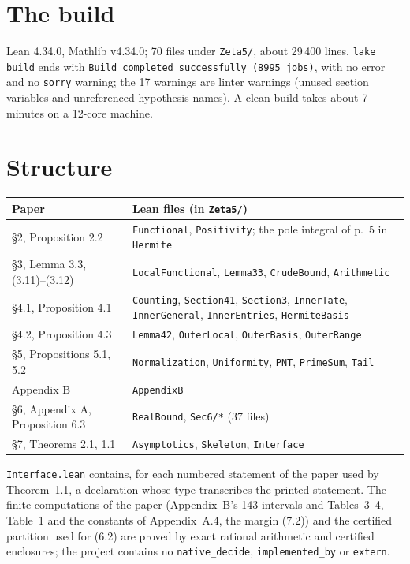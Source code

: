 \documentclass[11pt]{article}
\newcommand{\lean}[1]{\texttt{#1}}
\begin{document}
\section{The build}

Lean 4.34.0, Mathlib v4.34.0; 70 files under \lean{Zeta5/}, about 29\,400 lines.
\lean{lake build} ends with \lean{Build completed successfully (8995 jobs)}, with no error and
no \lean{sorry} warning; the 17 warnings are linter warnings (unused section variables and
unreferenced hypothesis names). A clean build takes about 7 minutes on a 12-core machine.

\section{Structure}

\begin{longtable}{p{}p{}}
\toprule
Paper & Lean files (in \lean{Zeta5/}) \\
\midrule
\endhead
\S2, Proposition 2.2 & \lean{Functional}, \lean{Positivity}; the pole integral of p.~5 in
\lean{Hermite} \\
\S3, Lemma 3.3, (3.11)--(3.12) & \lean{LocalFunctional}, \lean{Lemma33}, \lean{CrudeBound},
\lean{Arithmetic} \\
\S4.1, Proposition 4.1 & \lean{Counting}, \lean{Section41}, \lean{Section3}, \lean{InnerTate},
\lean{InnerGeneral}, \lean{InnerEntries}, \lean{HermiteBasis} \\
\S4.2, Proposition 4.3 & \lean{Lemma42}, \lean{OuterLocal}, \lean{OuterBasis},
\lean{OuterRange} \\
\S5, Propositions 5.1, 5.2 & \lean{Normalization}, \lean{Uniformity}, \lean{PNT},
\lean{PrimeSum}, \lean{Tail} \\
Appendix B & \lean{AppendixB} \\
\S6, Appendix A, Proposition 6.3 & \lean{RealBound}, \lean{Sec6/*} (37 files) \\
\S7, Theorems 2.1, 1.1 & \lean{Asymptotics}, \lean{Skeleton}, \lean{Interface} \\
\bottomrule
\end{longtable}

\noindent \lean{Interface.lean} contains, for each numbered statement of the paper used by
Theorem~1.1, a declaration whose type transcribes the printed statement. The finite
computations of the paper (Appendix~B's 143 intervals and Tables~3--4, Table~1 and the
constants of Appendix~A.4, the margin (7.2)) and the certified partition used for (6.2) are
proved by exact rational arithmetic and certified enclosures; the project contains no
\lean{native\_decide}, \lean{implemented\_by} or \lean{extern}.
\end{document}
